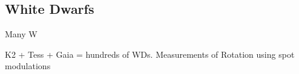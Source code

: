 {\color{red} \subsection{White Dwarfs}}
Many W

K2 + Tess + Gaia = hundreds of WDs. Measurements of Rotation using spot modulations